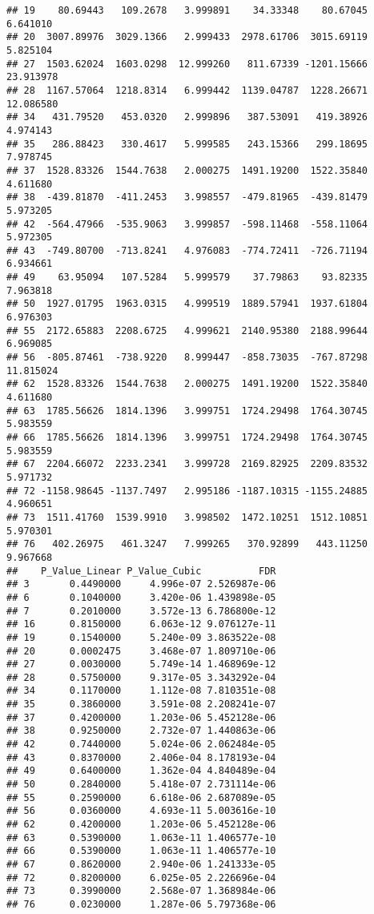 \documentclass[
]{article}
\begin{document}
\begin{verbatim}
## 19    80.69443   109.2678   3.999891    34.33348    80.67045  6.641010
## 20  3007.89976  3029.1366   2.999433  2978.61706  3015.69119  5.825104
## 27  1503.62024  1603.0298  12.999260   811.67339 -1201.15666 23.913978
## 28  1167.57064  1218.8314   6.999442  1139.04787  1228.26671 12.086580
## 34   431.79520   453.0320   2.999896   387.53091   419.38926  4.974143
## 35   286.88423   330.4617   5.999585   243.15366   299.18695  7.978745
## 37  1528.83326  1544.7638   2.000275  1491.19200  1522.35840  4.611680
## 38  -439.81870  -411.2453   3.998557  -479.81965  -439.81479  5.973205
## 42  -564.47966  -535.9063   3.999857  -598.11468  -558.11064  5.972305
## 43  -749.80700  -713.8241   4.976083  -774.72411  -726.71194  6.934661
## 49    63.95094   107.5284   5.999579    37.79863    93.82335  7.963818
## 50  1927.01795  1963.0315   4.999519  1889.57941  1937.61804  6.976303
## 55  2172.65883  2208.6725   4.999621  2140.95380  2188.99644  6.969085
## 56  -805.87461  -738.9220   8.999447  -858.73035  -767.87298 11.815024
## 62  1528.83326  1544.7638   2.000275  1491.19200  1522.35840  4.611680
## 63  1785.56626  1814.1396   3.999751  1724.29498  1764.30745  5.983559
## 66  1785.56626  1814.1396   3.999751  1724.29498  1764.30745  5.983559
## 67  2204.66072  2233.2341   3.999728  2169.82925  2209.83532  5.971732
## 72 -1158.98645 -1137.7497   2.995186 -1187.10315 -1155.24885  4.960651
## 73  1511.41760  1539.9910   3.998502  1472.10251  1512.10851  5.970301
## 76   402.26975   461.3247   7.999265   370.92899   443.11250  9.967668
##    P_Value_Linear P_Value_Cubic          FDR
## 3       0.4490000     4.996e-07 2.526987e-06
## 6       0.1040000     3.420e-06 1.439898e-05
## 7       0.2010000     3.572e-13 6.786800e-12
## 16      0.8150000     6.063e-12 9.076127e-11
## 19      0.1540000     5.240e-09 3.863522e-08
## 20      0.0002475     3.468e-07 1.809710e-06
## 27      0.0030000     5.749e-14 1.468969e-12
## 28      0.5750000     9.317e-05 3.343292e-04
## 34      0.1170000     1.112e-08 7.810351e-08
## 35      0.3860000     3.591e-08 2.208241e-07
## 37      0.4200000     1.203e-06 5.452128e-06
## 38      0.9250000     2.732e-07 1.440863e-06
## 42      0.7440000     5.024e-06 2.062484e-05
## 43      0.8370000     2.406e-04 8.178193e-04
## 49      0.6400000     1.362e-04 4.840489e-04
## 50      0.2840000     5.418e-07 2.731114e-06
## 55      0.2590000     6.618e-06 2.687089e-05
## 56      0.0360000     4.693e-11 5.003616e-10
## 62      0.4200000     1.203e-06 5.452128e-06
## 63      0.5390000     1.063e-11 1.406577e-10
## 66      0.5390000     1.063e-11 1.406577e-10
## 67      0.8620000     2.940e-06 1.241333e-05
## 72      0.8200000     6.025e-05 2.226696e-04
## 73      0.3990000     2.568e-07 1.368984e-06
## 76      0.0230000     1.287e-06 5.797368e-06
\end{verbatim}
\end{document}
